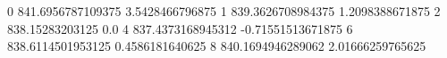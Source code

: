 0 841.6956787109375 3.5428466796875
1 839.3626708984375 1.2098388671875
2 838.15283203125 0.0
4 837.4373168945312 -0.71551513671875
6 838.6114501953125 0.4586181640625
8 840.1694946289062 2.01666259765625

